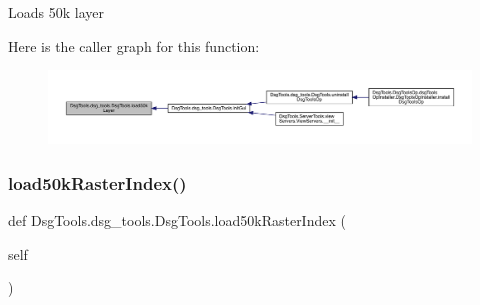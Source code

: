 \begin{DoxyVerb}Loads 50k layer
\end{DoxyVerb}
 Here is the caller graph for this function\+:
\nopagebreak
\begin{figure}[H]
\begin{center}
\leavevmode
\includegraphics[width=350pt]{class_dsg_tools_1_1dsg__tools_1_1_dsg_tools_a5e6e11f1f5a55805a7e6e79a6276f6d8_icgraph}
\end{center}
\end{figure}
\mbox{\label{class_dsg_tools_1_1dsg__tools_1_1_dsg_tools_a465d10a952bbd6c4ff805e8529ed0f9e}} 
\subsubsection{\texorpdfstring{load50k\+Raster\+Index()}{load50kRasterIndex()}}
{\footnotesize\ttfamily def Dsg\+Tools.\+dsg\+\_\+tools.\+Dsg\+Tools.\+load50k\+Raster\+Index (\begin{DoxyParamCaption}\item[{}]{self }\end{DoxyParamCaption})}

